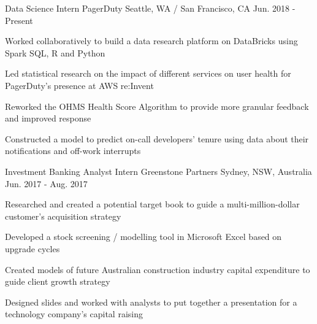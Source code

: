 

\begin{cventries}

  \cventry
    {Data Science Intern} %
    {PagerDuty} %
    {Seattle, WA / San Francisco, CA} %
    {Jun. 2018 - Present} %
    {
      \begin{cvitems} %
        \item {Worked collaboratively to build a data research platform on DataBricks using Spark SQL, R and Python}
        \item {Led statistical research on the impact of different services on user health for PagerDuty’s presence at AWS re:Invent}
        \item {Reworked the OHMS Health Score Algorithm to provide more granular feedback and improved response}
        \item{Constructed a model to predict on-call developers’ tenure using data about their notifications and off-work interrupts}
      \end{cvitems}
    }

  \cventry
    {Investment Banking Analyst Intern} %
    {Greenstone Partners} %
    {Sydney, NSW, Australia} %
    {Jun. 2017 - Aug. 2017} %
    {
      \begin{cvitems} %
        \item {Researched and created a potential target book to guide a multi-million-dollar customer’s acquisition strategy}
        \item {Developed a stock screening / modelling tool in Microsoft Excel based on upgrade cycles}
        \item {Created models of future Australian construction industry capital expenditure to guide client growth strategy}
        \item {Designed slides and worked with analysts to put together a presentation for a technology company’s capital raising}
      \end{cvitems}
    }


\end{cventries}

